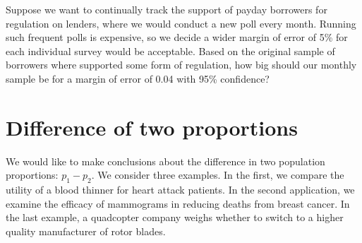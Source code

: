 
\begin{exercisewrap}
\begin{nexercise}
Suppose we want to continually track the support
of payday borrowers for regulation on lenders,
where we would conduct a new poll every month.
Running such frequent polls is expensive, so we decide
a wider margin of error of 5\% for each individual survey
would be acceptable.
Based on the original sample of borrowers where
\paydayRegPerc{} supported some form of regulation,
how big should our monthly sample be for a margin
of error of 0.04 with 95\% confidence?\footnotemark
\end{nexercise}
\end{exercisewrap}








\section{Difference of two proportions}
\label{differenceOfTwoProportions}

We would like to make conclusions about the difference
in two population proportions: \mbox{$p_1 - p_2$}.
We consider three examples.
In the first, we compare the utility of a blood thinner
for heart attack patients.
In the second application, we examine the efficacy of
mammograms in reducing deaths from breast cancer.
In the last example, a quadcopter company weighs whether
to switch to a higher quality manufacturer of rotor blades.

